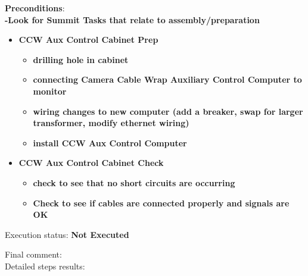 \documentclass[SE,lsstdraft,STR,toc]{lsstdoc}
\providecommand{\tightlist}{
  \setlength{\itemsep}{0pt}\setlength{\parskip}{0pt}}
\begin{document}
\textbf{ Preconditions}:\\
\textbf{{-Look for Summit Tasks that relate to assembly/preparation}}

\begin{itemize}
\tightlist
\item
  \textbf{{CCW Aux Control Cabinet Prep}}

  \begin{itemize}
  \tightlist
  \item
    \textbf{{drilling hole in cabinet}}
  \item
    \textbf{{connecting Camera Cable Wrap Auxiliary Control Computer to
    monitor}}
  \item
    {\textbf{wiring changes to new computer (add a breaker, swap for
    larger transformer, modify ethernet wiring)}}
  \item
    \textbf{{install CCW Aux Control Computer}}
  \end{itemize}
\end{itemize}

\begin{itemize}
\tightlist
\item
  \textbf{\textbf{{CCW Aux Control Cabinet Check}}}

  \begin{itemize}
  \tightlist
  \item
    \textbf{{check to see that no short circuits are occurring}}
  \item
    \textbf{{Check to see if cables are connected properly and signals
    are OK}}
  \end{itemize}
\end{itemize}


Execution status: {\bf Not Executed }

Final comment:\\


Detailed steps results:
\end{document}
